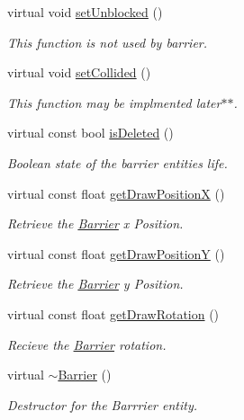\begin{DoxyCompactItemize}
virtual void \hyperlink{classBarrier_a863ef65ef677abdcf97373157f86c138}{set\-Unblocked} ()
\begin{DoxyCompactList}\small\item\em This function is not used by barrier. \end{DoxyCompactList}\item 
virtual void \hyperlink{classBarrier_adeedae22d7df279613359026ecf9f279}{set\-Collided} ()
\begin{DoxyCompactList}\small\item\em This function may be implmented later$\ast$$\ast$. \end{DoxyCompactList}\item 
virtual const bool \hyperlink{classBarrier_a8199ad8a6f070435da55832bdd3893b8}{is\-Deleted} ()
\begin{DoxyCompactList}\small\item\em Boolean state of the barrier entities life. \end{DoxyCompactList}\item 
virtual const float \hyperlink{classBarrier_a53317aaef27996362c933d65914d663c}{get\-Draw\-Position\-X} ()
\begin{DoxyCompactList}\small\item\em Retrieve the \hyperlink{classBarrier}{Barrier} x Position. \end{DoxyCompactList}\item 
virtual const float \hyperlink{classBarrier_af90c9b4b6f28c7710637ccda7148fbd4}{get\-Draw\-Position\-Y} ()
\begin{DoxyCompactList}\small\item\em Retrieve the \hyperlink{classBarrier}{Barrier} y Position. \end{DoxyCompactList}\item 
virtual const float \hyperlink{classBarrier_aac579711db52df907e86ef4deea7ba1d}{get\-Draw\-Rotation} ()
\begin{DoxyCompactList}\small\item\em Recieve the \hyperlink{classBarrier}{Barrier} rotation. \end{DoxyCompactList}\item 
virtual \hyperlink{classBarrier_a401f40e73302009b305904ffc7825304}{$\sim$\-Barrier} ()
\begin{DoxyCompactList}\small\item\em Destructor for the Barrrier entity. \end{DoxyCompactList}\end{DoxyCompactItemize}
